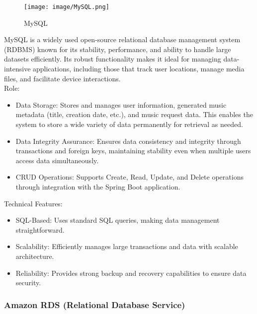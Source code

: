 \documentclass[conference]{IEEEtran}
\begin{document}
\begin{figure}[h!]
    \centering
    \texttt{[image: image/MySQL.png]}
    \caption{MySQL}
    \label{fig:enter-label}
\end{figure}

\noindent MySQL is a widely used open-source relational database management system (RDBMS) known for its stability, performance, and ability to handle large datasets efficiently. Its robust functionality makes it ideal for managing data-intensive applications, including those that track user locations, manage media files, and facilitate device interactions.\\

Role:
\begin{itemize}
    \item Data Storage: Stores and manages user information, generated music metadata (title, creation date, etc.), and music request data. This enables the system to store a wide variety of data permanently for retrieval as needed.\\
    \item Data Integrity Assurance: Ensures data consistency and integrity through transactions and foreign keys, maintaining stability even when multiple users access data simultaneously.\\
    \item CRUD Operations: Supports Create, Read, Update, and Delete operations through integration with the Spring Boot application.\\
\end{itemize}

Technical Features:
\begin{itemize}
\item SQL-Based: Uses standard SQL queries, making data management straightforward.\\
\item Scalability: Efficiently manages large transactions and data with scalable architecture.\\
\item Reliability: Provides strong backup and recovery capabilities to ensure data security.\\
\end{itemize}

\subsubsection{Amazon RDS (Relational Database Service)}
\end{document}
